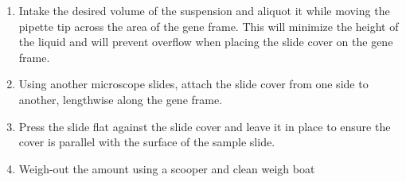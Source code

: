 \begin{enumerate}
    \item Intake the desired volume of the suspension and aliquot it while moving the pipette tip across the area of the gene frame. This will minimize the height of the liquid and will prevent overflow when placing the slide cover on the gene frame.

    \item Using another microscope slides, attach the slide cover from one side to another, lengthwise along the gene frame.

    \item Press the slide flat against the slide cover and leave it in place to ensure the cover is parallel with the surface of the sample slide.
    
    \item Weigh-out the amount using a scooper and clean weigh boat
    

\end{enumerate}

